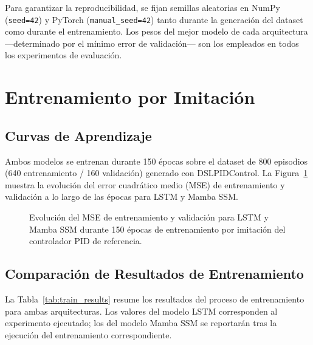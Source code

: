 Para garantizar la reproducibilidad, se fijan semillas aleatorias en NumPy (\texttt{seed=42}) y PyTorch (\texttt{manual\_seed=42}) tanto durante la generación del dataset como durante el entrenamiento. Los pesos del mejor modelo de cada arquitectura —determinado por el mínimo error de validación— son los empleados en todos los experimentos de evaluación.


\section{Entrenamiento por Imitación}

\subsection{Curvas de Aprendizaje}

Ambos modelos se entrenan durante 150 épocas sobre el dataset de 800 episodios (640 entrenamiento / 160 validación) generado con DSLPIDControl. La Figura~\ref{fig:curvas_entrenamiento} muestra la evolución del error cuadrático medio (MSE) de entrenamiento y validación a lo largo de las épocas para LSTM y Mamba SSM.

\begin{figure}[htbp]
\centering
{}
\caption{Evolución del MSE de entrenamiento y validación para LSTM y Mamba SSM durante 150 épocas de entrenamiento por imitación del controlador PID de referencia.}
\label{fig:curvas_entrenamiento}
\end{figure}

\subsection{Comparación de Resultados de Entrenamiento}

La Tabla~\ref{tab:train_results} resume los resultados del proceso de entrenamiento para ambas arquitecturas. Los valores del modelo LSTM corresponden al experimento ejecutado; los del modelo Mamba SSM se reportarán tras la ejecución del entrenamiento correspondiente.

